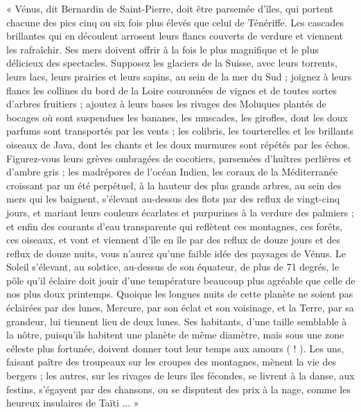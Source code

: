 \documentclass[a4paper, 11pt, oneside, landscape]{article}
\begin{document}
« Vénus, dit Bernardin de Saint-Pierre, doit être parsemée d'îles, qui portent chacune des pics cinq ou six fois plus élevés que celui de Ténériffe. Les cascades brillantes qui en découlent arrosent leurs flancs couverts de verdure et viennent les rafraîchir. Ses mers doivent offrir à la fois le plus magnifique et le plus délicieux des spectacles. Supposez les glaciers de la Suisse, avec leurs torrents, leurs lacs, leurs prairies et leurs sapins, au sein de la mer du Sud ; joignez à leurs flancs les collines du bord de la Loire couronnées de vignes et de toutes sortes d'arbres fruitiers ; ajoutez à leurs bases les rivages des Moluques plantés de bocages où sont suspendues les bananes, les muscades, les girofles, dont les doux parfums sont transportés par les vents ; les colibris, les tourterelles et les brillants oiseaux de Java, dont les chants et les doux murmures sont répétés par les échos. Figurez-vous leurs grèves ombragées de cocotiers, parsemées d'huîtres perlières et d'ambre gris ; les madrépores de l'océan Indien, les coraux de la Méditerranée croissant par un été perpétuel, à la hauteur des plus grands arbres, au sein des mers qui les baignent, s'élevant au-dessus des flots par des reflux de vingt-cinq jours, et mariant leurs couleurs écarlates et purpurines à la verdure des palmiers ; et enfin des courants d'eau transparente qui reflètent ces montagnes, ces forêts, ces oiseaux, et vont et viennent d'île en île par des reflux de douze jours et des reflux de douze nuits, vous n'aurez qu'une faible idée des paysages de Vénus. Le Soleil s'élevant, au solstice, au-dessus de son équateur, de plus de 71 degrés, le pôle qu'il éclaire doit jouir d'une température beaucoup plus agréable que celle de nos plus doux printemps. Quoique les longues nuits de cette planète ne soient pas éclairées par des lunes, Mercure, par son éclat et son voisinage, et la Terre, par sa grandeur, lui tiennent lieu de deux lunes. Ses habitants, d'une taille semblable à la nôtre, puisqu'ils habitent une planète de même diamètre, mais sous une zone céleste plus fortunée, doivent donner tout leur temps aux amours ( ! ). Les uns, faisant paître des troupeaux sur les croupes des montagnes, mènent la vie des bergers ; les autres, sur les rivages de leurs îles fécondes, se livrent à la danse, aux festins, s'égayent par des chansons, ou se disputent des prix à la nage, comme les heureux insulaires de Taïti ... »
\end{document}
